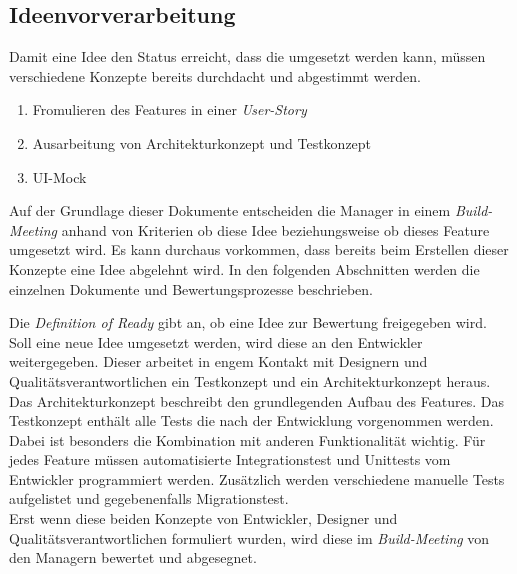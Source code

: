 \subsection{Ideenvorverarbeitung}
Damit eine Idee den Status erreicht, dass die umgesetzt werden kann, müssen verschiedene Konzepte bereits durchdacht und abgestimmt werden. 
\begin{enumerate}
    \item Fromulieren des Features in einer \textit{User-Story}
    \item Ausarbeitung von Architekturkonzept und Testkonzept
    \item UI-Mock
\end{enumerate}
Auf der Grundlage dieser Dokumente entscheiden die Manager in einem \textit{Build-Meeting} anhand von Kriterien ob diese Idee beziehungsweise ob dieses Feature 
umgesetzt wird. Es kann durchaus vorkommen, dass bereits beim Erstellen dieser Konzepte eine Idee abgelehnt wird. In den folgenden Abschnitten werden
die einzelnen Dokumente und Bewertungsprozesse beschrieben.

Die \textit{Definition of Ready} gibt an, ob eine Idee zur Bewertung freigegeben wird.
Soll eine neue Idee umgesetzt werden, wird diese an den Entwickler weitergegeben. Dieser 
arbeitet in engem Kontakt mit Designern und Qualitätsverantwortlichen ein Testkonzept und ein Architekturkonzept heraus. 
Das Architekturkonzept beschreibt den grundlegenden Aufbau des Features. 
Das Testkonzept enthält alle Tests die nach der Entwicklung vorgenommen werden. Dabei ist besonders die Kombination mit anderen Funktionalität 
wichtig. Für jedes Feature müssen automatisierte Integrationstest und Unittests vom Entwickler programmiert werden. Zusätzlich werden verschiedene
manuelle Tests aufgelistet und gegebenenfalls Migrationstest.\\
Erst wenn diese beiden Konzepte von Entwickler, Designer und Qualitätsverantwortlichen formuliert wurden, wird diese im 
\textit{Build-Meeting} von den Managern bewertet und abgesegnet. 


